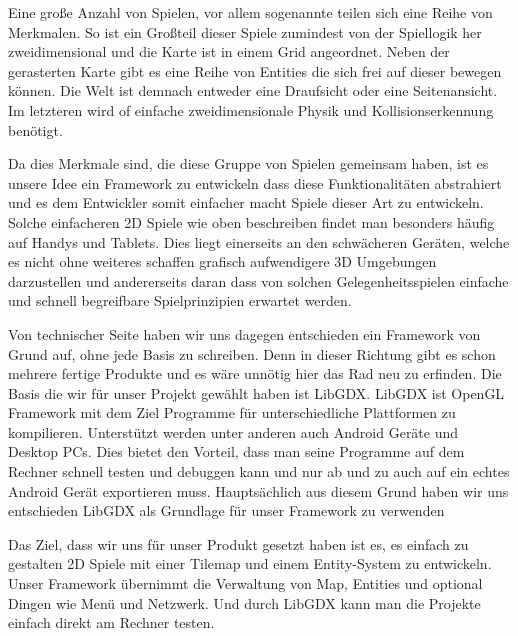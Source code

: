 Eine große Anzahl von Spielen, vor allem sogenannte  teilen sich eine Reihe von Merkmalen.
So ist ein Großteil dieser Spiele zumindest von der Spiellogik her zweidimensional und die Karte ist in einem Grid angeordnet. Neben der gerasterten Karte gibt es eine Reihe von Entities die sich frei auf dieser bewegen können. Die Welt ist demnach entweder eine Draufsicht oder eine Seitenansicht. Im letzteren wird of einfache zweidimensionale Physik und Kollisionserkennung benötigt.

Da dies Merkmale sind, die diese Gruppe von Spielen gemeinsam haben, ist es unsere Idee ein Framework zu entwickeln dass diese Funktionalitäten abstrahiert und es dem Entwickler somit einfacher macht Spiele dieser Art zu entwickeln.
Solche einfacheren 2D Spiele wie oben beschreiben findet man besonders häufig auf Handys und Tablets. Dies liegt einerseits an den schwächeren Geräten, welche es nicht ohne weiteres schaffen grafisch aufwendigere 3D Umgebungen darzustellen und andererseits daran dass von solchen Gelegenheitsspielen einfache und schnell begreifbare Spielprinzipien erwartet werden.

Von technischer Seite haben wir uns dagegen entschieden ein Framework von Grund auf, ohne jede Basis zu schreiben. Denn in dieser Richtung gibt es schon mehrere fertige Produkte und es wäre unnötig hier das Rad neu zu erfinden. 
Die Basis die wir für unser Projekt gewählt haben ist LibGDX. LibGDX ist OpenGL Framework mit dem Ziel Programme für unterschiedliche Plattformen zu kompilieren. Unterstützt werden unter anderen auch Android Geräte und Desktop PCs. Dies bietet den Vorteil, dass man seine Programme auf dem Rechner schnell testen und debuggen kann und nur ab und zu auch auf ein echtes Android Gerät exportieren muss. Hauptsächlich aus diesem Grund haben wir uns entschieden LibGDX als Grundlage für unser Framework zu verwenden

Das Ziel, dass wir uns für unser Produkt gesetzt haben ist es, es einfach zu gestalten 2D Spiele mit einer Tilemap und einem Entity-System zu entwickeln. Unser Framework übernimmt die Verwaltung von Map, Entities und optional Dingen wie Menü und Netzwerk. Und durch LibGDX kann man die Projekte einfach direkt am Rechner testen.
